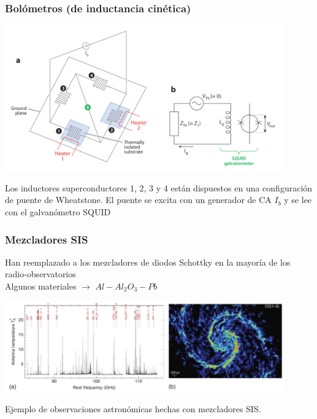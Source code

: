 \documentclass{beamer}
\begin{document}
\begin{frame}
				\frametitle{Bolómetros (de inductancia cinética)}
								\begin{center}
												\includegraphics[height=0.48\textheight,width=0.9\textwidth]{detector_bolometro_kid}
								\end{center}
								Los inductores superconductores 1, 2, 3 y 4 están
								dispuestos en una configuración de \alert{puente de Wheatstone}. 
								El puente se excita con un generador de CA $I_b$ y se lee con el
								galvanómetro \alert{SQUID}
\end{frame} 

\begin{frame}
				\frametitle{Mezcladores SIS}
				Han reemplazado a los mezcladores de diodos Schottky en la mayoría de
				los radio-observatorios\\
				Algunos materiales $\to$ $Al-Al_2 O_3-Pb$
								\begin{center}
												\includegraphics[height=0.38\textheight,width=0.9\textwidth]{sis_mixers}
								\end{center}
								Ejemplo de observaciones astronómicas hechas con mezcladores
								SIS.
\end{frame} 
\end{document}
